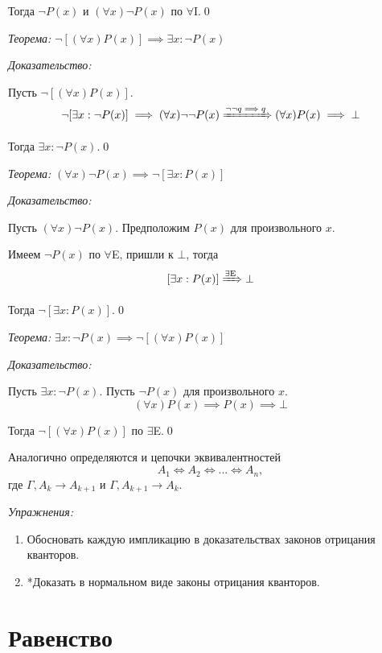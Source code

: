 Тогда $\lnot P(x)$ и $(\forall x)\lnot P(x)$
по $\forall$I.\qed

\pagebreak
{\it Теорема:} $\lnot[(\forall x)P(x)]\implies \exists x:\lnot P(x)$

{\it Доказательство:}

Пусть $\lnot[(\forall x)P(x)]$.
\[
	\lnot[\exists x:\lnot P(x)]\implies (\forall x)\lnot\lnot P(x)
	\xRightarrow{\lnot\lnot q\implies q} (\forall x)P(x)\implies\bot
\]

Тогда $\exists x:\lnot P(x)$.\qed

\vspace{1em}
{\it Теорема:} $(\forall x)\lnot P(x)\implies \lnot[\exists x:P(x)]$

{\it Доказательство:}

Пусть $(\forall x)\lnot P(x)$. Предположим $P(x)$ для произвольного $x$.

Имеем $\lnot P(x)$ по $\forall$E, пришли к $\bot$, тогда
\[
	[\exists x:P(x)]\xRightarrow{\text{$\exists$E}}\bot
\]

Тогда $\lnot[\exists x:P(x)]$.\qed

\vspace{1em}
{\it Теорема:} $\exists x:\lnot P(x)\implies\lnot[(\forall x)P(x)]$

{\it Доказательство:}

Пусть $\exists x:\lnot P(x)$. Пусть $\lnot P(x)$ для произвольного $x$.
\[
	(\forall x)P(x)\implies P(x)\implies \bot
\]

Тогда $\lnot[(\forall x)P(x)]$ по $\exists$E.\qed

\vspace{1em}
Аналогично определяются и цепочки эквивалентностей
\[
	A_1\iff A_2\iff ...\iff A_{n},
\]
где $\Gamma,A_{k}\to A_{k+1}$ и $\Gamma,A_{k+1}\to A_{k}$.

\vspace{1em}
{\it Упражнения:}
\begin{enumerate}
	\item{}Обосновать каждую импликацию в доказательствах законов отрицания кванторов.
	\item{}*Доказать в нормальном виде законы отрицания кванторов.
\end{enumerate}

\section{Равенство}

